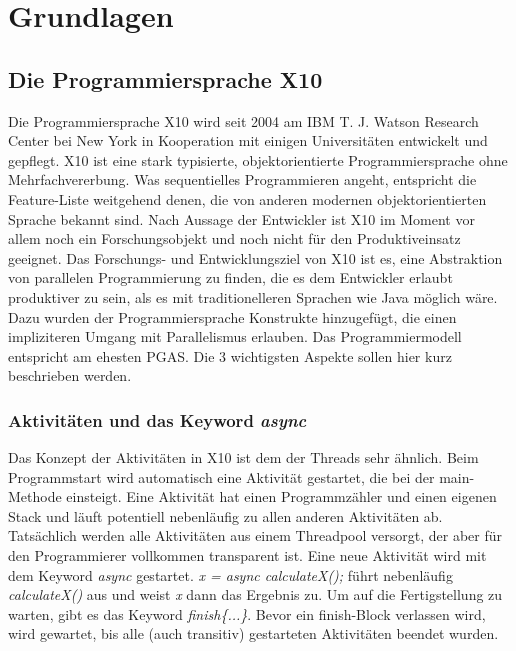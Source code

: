 \chapter{Grundlagen} %
\label{cha:grundlagen}

\section{Die Programmiersprache X10} %
\label{sec:die_programmiersprache_x10}
Die Programmiersprache X10 wird seit 2004 am IBM T. J. Watson Research Center bei New York in Kooperation mit einigen Universitäten entwickelt und gepflegt. X10 ist eine stark typisierte, objektorientierte Programmiersprache ohne Mehrfachvererbung. Was sequentielles Programmieren angeht, entspricht die Feature-Liste weitgehend denen, die von anderen modernen objektorientierten Sprache bekannt sind. Nach Aussage der Entwickler ist X10 im Moment vor allem noch ein Forschungsobjekt und noch nicht für den Produktiveinsatz geeignet. Das Forschungs- und Entwicklungsziel von X10 ist es, eine Abstraktion von parallelen Programmierung zu finden, die es dem Entwickler erlaubt produktiver zu sein, als es mit traditionelleren Sprachen wie Java möglich wäre. Dazu wurden der Programmiersprache Konstrukte hinzugefügt, die einen impliziteren Umgang mit Parallelismus erlauben. Das Programmiermodell entspricht am ehesten PGAS. Die 3 wichtigsten Aspekte sollen hier kurz beschrieben werden.\cite{x10FAQ:2012:Online}

\subsection{Aktivitäten und das Keyword \textit{async}}  %
\label{sub:aktivitaeten_und_das_keyword_async}
Das Konzept der Aktivitäten in X10 ist dem der Threads sehr ähnlich. Beim Programmstart wird automatisch eine Aktivität gestartet, die bei der main-Methode einsteigt. Eine Aktivität hat einen Programmzähler und einen eigenen Stack und läuft potentiell nebenläufig zu allen anderen Aktivitäten ab. Tatsächlich werden alle Aktivitäten aus einem Threadpool versorgt, der aber für den Programmierer vollkommen transparent ist. Eine neue Aktivität wird mit dem Keyword \textit{async} gestartet. \textit{ x = async calculateX();} führt nebenläufig \textit{calculateX()} aus und weist \textit{x} dann das Ergebnis zu. Um auf die Fertigstellung zu warten, gibt es das Keyword \textit{finish\{...\}}. Bevor ein finish-Block verlassen wird, wird gewartet, bis alle (auch transitiv) gestarteten Aktivitäten beendet wurden.\cite{x10Spec:2012:Online}

